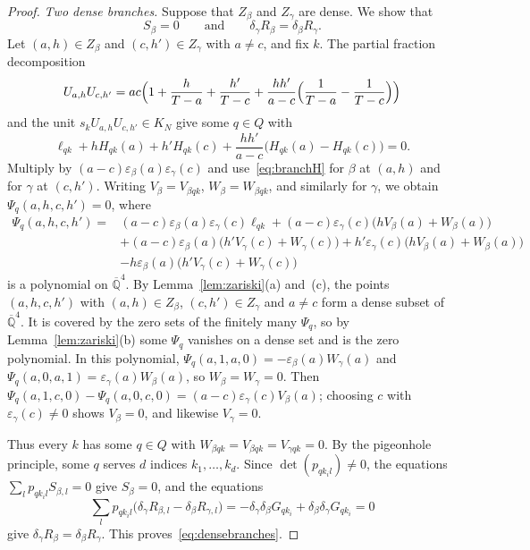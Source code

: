 \documentclass[10pt]{article}
\theoremstyle{remark}
\newcommand{\Qbar}{\overline{\mathbb Q}}
\begin{document}
\begin{proof}
\emph{Two dense branches.} Suppose that $Z_\beta$ and $Z_\gamma$ are dense. We show that
\begin{equation}\label{eq:densebranches}
 S_\beta=0\qquad\text{and}\qquad\delta_\gamma R_\beta=\delta_\beta R_\gamma.
\end{equation}
Let $(a,h)\in Z_\beta$ and $(c,h')\in Z_\gamma$ with $a\ne c$, and fix $k$. The partial fraction decomposition
\[
 U_{a,h}U_{c,h'}=ac\Bigl(1+\frac h{T-a}+\frac{h'}{T-c}+\frac{hh'}{a-c}\Bigl(\frac1{T-a}-\frac1{T-c}\Bigr)\Bigr)
\]
and the unit $s_kU_{a,h}U_{c,h'}\in K_N$ give some $q\in Q$ with
\[
 \ell_{qk}+hH_{qk}(a)+h'H_{qk}(c)+\frac{hh'}{a-c}\bigl(H_{qk}(a)-H_{qk}(c)\bigr)=0.
\]
Multiply by $(a-c)\varepsilon_\beta(a)\varepsilon_\gamma(c)$ and use~\eqref{eq:branchH} for $\beta$ at $(a,h)$ and for $\gamma$ at $(c,h')$. Writing $V_\beta=V_{\beta qk}$, $W_\beta=W_{\beta qk}$, and similarly for $\gamma$, we obtain $\Psi_q(a,h,c,h')=0$, where
\[
\begin{aligned}
 \Psi_q(a,h,c,h')={}&(a-c)\varepsilon_\beta(a)\varepsilon_\gamma(c)\ell_{qk}
 +(a-c)\varepsilon_\gamma(c)\bigl(hV_\beta(a)+W_\beta(a)\bigr)\\
 &+(a-c)\varepsilon_\beta(a)\bigl(h'V_\gamma(c)+W_\gamma(c)\bigr)
 +h'\varepsilon_\gamma(c)\bigl(hV_\beta(a)+W_\beta(a)\bigr)\\
 &-h\varepsilon_\beta(a)\bigl(h'V_\gamma(c)+W_\gamma(c)\bigr)
\end{aligned}
\]
is a polynomial on $\Qbar^4$. By Lemma~\ref{lem:zariski}(a) and~(c), the points $(a,h,c,h')$ with $(a,h)\in Z_\beta$, $(c,h')\in Z_\gamma$ and $a\ne c$ form a dense subset of $\Qbar^4$. It is covered by the zero sets of the finitely many $\Psi_q$, so by Lemma~\ref{lem:zariski}(b) some $\Psi_q$ vanishes on a dense set and is the zero polynomial. In this polynomial, $\Psi_q(a,1,a,0)=-\varepsilon_\beta(a)W_\gamma(a)$ and $\Psi_q(a,0,a,1)=\varepsilon_\gamma(a)W_\beta(a)$, so $W_\beta=W_\gamma=0$. Then $\Psi_q(a,1,c,0)-\Psi_q(a,0,c,0)=(a-c)\varepsilon_\gamma(c)V_\beta(a)$; choosing $c$ with $\varepsilon_\gamma(c)\ne0$ shows $V_\beta=0$, and likewise $V_\gamma=0$.

Thus every $k$ has some $q\in Q$ with $W_{\beta qk}=V_{\beta qk}=V_{\gamma qk}=0$. By the pigeonhole principle, some $q$ serves $d$ indices $k_1,\ldots,k_d$. Since $\det(p_{qk_il})\ne0$, the equations $\sum_lp_{qk_il}S_{\beta,l}=0$ give $S_\beta=0$, and the equations
\[
 \sum_lp_{qk_il}\bigl(\delta_\gamma R_{\beta,l}-\delta_\beta R_{\gamma,l}\bigr)=-\delta_\gamma\delta_\beta G_{qk_i}+\delta_\beta\delta_\gamma G_{qk_i}=0
\]
give $\delta_\gamma R_\beta=\delta_\beta R_\gamma$. This proves~\eqref{eq:densebranches}.


\end{proof}
\end{document}

